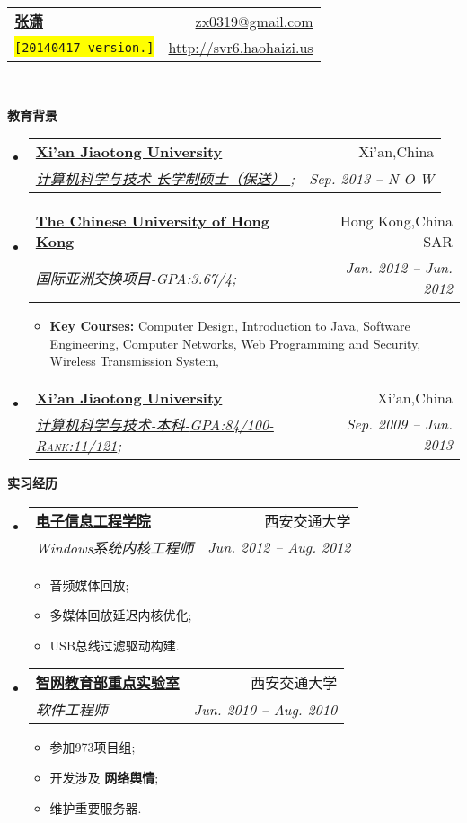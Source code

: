 \documentclass[letterpaper,11pt]{article}
\makeatletter
\newcommand{\resitem}[1]{\item #1 \vspace{-2pt}}
\newcommand{\resheading}[1]{{\large \colorbox{mygrey}{\begin{minipage}{\textwidth}{\textbf{#1 \vphantom{p\^{E}}}}\end{minipage}}}}
\newcommand{\ressubheading}[4]{
\begin{tabular*}{6.5in}{l@{\extracolsep{\fill}}r}
		\textbf{#1} & #2 \\
		\textit{#3} & \textit{#4} \\
\end{tabular*}\vspace{-6pt}}
\makeatother
\begin{document}
\begin{CJK}{UTF8}{gbsn}

\newcommand{\mywebheader}{
\begin{tabular*}{7in}{l@{\extracolsep{\fill}}r}
	\textbf{\href{http://svr6.haohaizi.us/}{\LARGE 张潇}} & \href{mailto:zx0319@gmail.com}{zx0319@gmail.com}\\
	{\footnotesize \texttt{\colorbox{yellow}{[20140417 version.]}}} & \href{http://svr6.haohaizi.us}{http://svr6.haohaizi.us} \\
	\end{tabular*}
\\
\vspace{0.1in}}

\mywebheader

\resheading{教育背景}
	\begin{itemize}
	\item
			\ressubheading{\href{http://www.xjtu.edu.cn}{Xi'an Jiaotong University}}{Xi'an,China}{\href{http://www.cs.xjtu.edu.cn}{计算机科学与技术-长学制硕士（保送） };}{Sep. 2013 --  N O W }
	\item
			\ressubheading{\href{http://www.cuhk.edu.hk}{The Chinese University of Hong Kong}}{Hong Kong,China SAR}{{国际亚洲交换项目-\textsc{GPA:3.67/4}};}{Jan. 2012 -- Jun. 2012}
				{ \footnotesize
				\begin{itemize}
					\resitem
					{\textbf{Key Courses:}
						{Computer Design},
						{Introduction to Java},
						{Software Engineering},
						{Computer Networks},
						{Web Programming and Security},
						{Wireless Transmission System},
					}
				\end{itemize}
			}
			
		
		\item
			\ressubheading{\href{http://www.xjtu.edu.cn}{Xi'an Jiaotong University}}{Xi'an,China}{\href{http://www.cs.xjtu.edu.cn}{计算机科学与技术-本科-\textsc{GPA:84/100-Rank:11/121}};}{Sep. 2009 -- Jun. 2013}
			
		
	\end{itemize} %

\resheading{实习经历}
	\begin{itemize}
		\item 
			\ressubheading{\href{http://eie.xjtu.edu.cn/}{电子信息工程学院}}{西安交通大学}{Windows系统内核工程师}{Jun. 2012 -- Aug. 2012}
				{ \footnotesize
				\begin{itemize}
					\resitem{音频媒体回放;}
					\resitem{多媒体回放延迟内核优化;}
					\resitem{USB总线过滤驱动构建.}
				\end{itemize}
				}
		\item 
			\ressubheading{\href{http://nskeylab.xjtu.edu.cn/}{智网教育部重点实验室}}{西安交通大学}{软件工程师}{Jun. 2010 -- Aug. 2010}
				{ \footnotesize
				\begin{itemize}
					\resitem{参加973项目组;}
					\resitem{开发涉及 \textbf{网络舆情};}
					\resitem{维护重要服务器.}
				\end{itemize}
				}
	\end{itemize}
	

\end{CJK}
\end{document}
